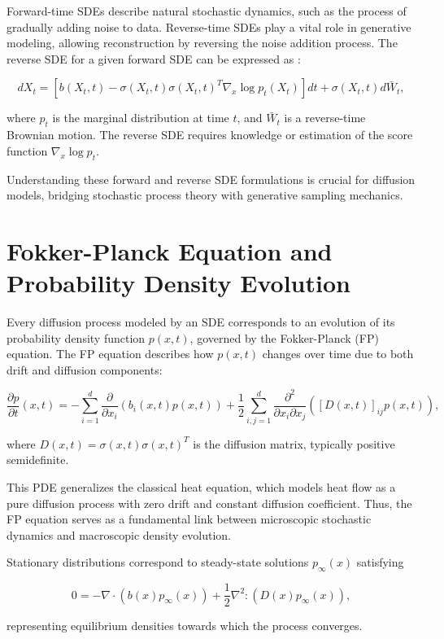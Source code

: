 Forward-time SDEs describe natural stochastic dynamics, such as the process of gradually adding noise to data. Reverse-time SDEs play a vital role in generative modeling, allowing reconstruction by reversing the noise addition process. The reverse SDE for a given forward SDE can be expressed as \cite{Anderson1982,Chen2021}:

\[
dX_t = \left[ b(X_t, t) - \sigma(X_t, t) \sigma(X_t, t)^T \nabla_x \log p_t(X_t) \right]dt + \sigma(X_t, t) d\bar{W}_t,
\]

where \( p_t \) is the marginal distribution at time \( t \), and \( \bar{W}_t \) is a reverse-time Brownian motion. The reverse SDE requires knowledge or estimation of the score function \( \nabla_x \log p_t \).

Understanding these forward and reverse SDE formulations is crucial for diffusion models, bridging stochastic process theory with generative sampling mechanics.

\section{Fokker-Planck Equation and Probability Density Evolution}

Every diffusion process modeled by an SDE corresponds to an evolution of its probability density function \( p(x,t) \), governed by the Fokker-Planck (FP) equation. The FP equation describes how \( p(x,t) \) changes over time due to both drift and diffusion components:

\[
\frac{\partial p}{\partial t}(x,t) = - \sum_{i=1}^d \frac{\partial}{\partial x_i} \left( b_i(x,t) p(x,t) \right) + \frac{1}{2} \sum_{i,j=1}^d \frac{\partial^2}{\partial x_i \partial x_j} \left( [D(x,t)]_{ij} p(x,t) \right),
\]

where \( D(x,t) = \sigma(x,t) \sigma(x,t)^T \) is the diffusion matrix, typically positive semidefinite.

This PDE generalizes the classical heat equation, which models heat flow as a pure diffusion process with zero drift and constant diffusion coefficient. Thus, the FP equation serves as a fundamental link between microscopic stochastic dynamics and macroscopic density evolution.

Stationary distributions correspond to steady-state solutions \( p_\infty(x) \) satisfying

\[
0 = -\nabla \cdot (b(x) p_\infty(x)) + \frac{1}{2} \nabla^2 : (D(x) p_\infty(x)),
\]

representing equilibrium densities towards which the process converges.

